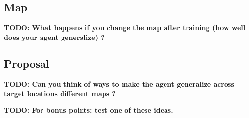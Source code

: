 \documentclass[a4paper,14pt]{article}
\begin{document}
\subsection{Map}
\textbf{TODO: What happens if you change the map after training (how well does your
agent generalize) ?}
\subsection{Proposal}
\textbf{TODO: Can you think of ways to make the agent generalize across target locations
different maps ?}

\textbf{TODO: For bonus points: test one of these ideas.}

\end{document}
